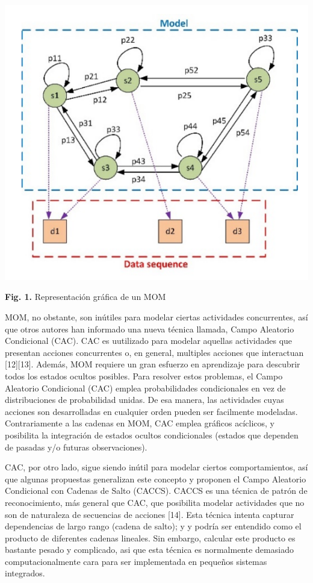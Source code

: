 \documentclass[a4paper]{article}
\begin{document}
\begin{}
\begin{}
\begin{}
\center\includegraphics{fig_1.png} 
\center\begin{}\textbf{Fig. 1.} Representación gráfica de un MOM
\setlegtth{\parindent}{<}\begin{}MOM, no obstante, son inútiles para modelar ciertas actividades concurrentes, así que otros autores han informado una nueva técnica llamada, Campo Aleatorio Condicional (CAC). CAC es uutilizado para modelar aquellas actividades que presentan acciones concurrentes o, en general, multiples acciones que interactuan [12][13]. Además, MOM requiere un gran esfuerzo en aprendizaje para descubrir todos los estados ocultos posibles. Para resolver estos problemas, el Campo Aleatorio Condicional (CAC) emplea probabilidades condicionales en vez de distribuciones de probabilidad unidas. De esa manera, las actividades cuyas acciones son desarrolladas en cualquier orden pueden ser facilmente modeladas. Contrariamente a las cadenas en MOM, CAC emplea gráficos acíclicos, y posibilita la integración de estados ocultos condicionales (estados que dependen de pasadas y/o futuras observaciones).
\setlegtth{\parindent}{<}\begin{}CAC, por otro lado, sigue siendo inútil para modelar ciertos comportamientos, así que algunas propuestas generalizan este concepto y proponen el Campo Aleatorio Condicional con Cadenas de Salto
(CACCS). CACCS es una técnica de patrón de reconocimiento, más general que CAC, que posibilita modelar actividades que no son de naturaleza de secuencias de acciones [14]. Esta técnica intenta capturar dependencias de largo rango (cadena de salto); y y podría ser entendido como el producto de diferentes cadenas lineales. Sin embargo, calcular este producto es bastante pesado y complicado, asi que esta técnica es normalmente demasiado computacionalmente cara para ser implementada en pequeños sistemas integrados. 

\end{}
\end{}
\end{}
\end{}
\end{}
\end{}
\end{document}
